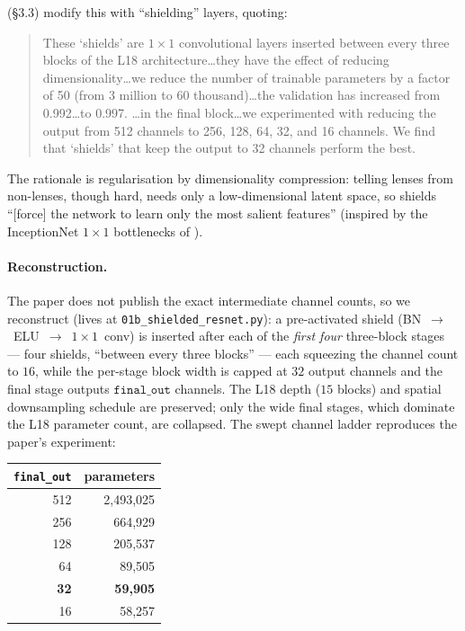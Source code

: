 \documentclass[11pt,letterpaper]{article}
\begin{document}
\textcite{huang2021desi} (\S3.3) modify this with ``shielding'' layers, quoting:
\begin{quote}\small
These `shields' are $1{\times}1$ convolutional layers inserted between every
three blocks of the L18 architecture\ldots they have the effect of reducing
dimensionality\ldots we reduce the number of trainable parameters by a factor of
50 (from 3 million to 60 thousand)\ldots the validation \AUC{} has increased
from 0.992\ldots to 0.997. \ldots in the final block\ldots we experimented with
reducing the output from 512 channels to 256, 128, 64, 32, and 16 channels. We
find that `shields' that keep the output to 32 channels perform the best.
\end{quote}
The rationale is regularisation by dimensionality compression: telling lenses
from non-lenses, though hard, needs only a low-dimensional latent space, so
shields ``[force] the network to learn only the most salient features''
(inspired by the InceptionNet $1{\times}1$ bottlenecks of
\textcite{szegedy2015inception}).

\paragraph{Reconstruction.} The paper does not publish the exact intermediate
channel counts, so we reconstruct (lives at
\texttt{01b\_shielded\_resnet.py}): a pre-activated shield
(\textsc{BN}~$\to$~ELU~$\to$~$1{\times}1$~conv) is inserted after each of the
\emph{first four} three-block stages --- four shields, ``between every three
blocks'' --- each squeezing the channel count to $16$, while the per-stage block
width is capped at $32$ output channels and the final stage outputs
$\mathtt{final\_out}$ channels. The L18 depth ($15$ blocks) and spatial
downsampling schedule are preserved; only the wide final stages, which dominate
the L18 parameter count, are collapsed. The swept channel ladder reproduces the
paper's experiment:

\begin{center}\small
\begin{tabular}{r r}
\toprule
\texttt{final\_out} & parameters \\
\midrule
512 & 2{,}493{,}025 \\
256 & 664{,}929 \\
128 & 205{,}537 \\
64  & 89{,}505 \\
\textbf{32} & \textbf{59{,}905} \\
16  & 58{,}257 \\
\bottomrule
\end{tabular}
\end{center}
\end{document}
